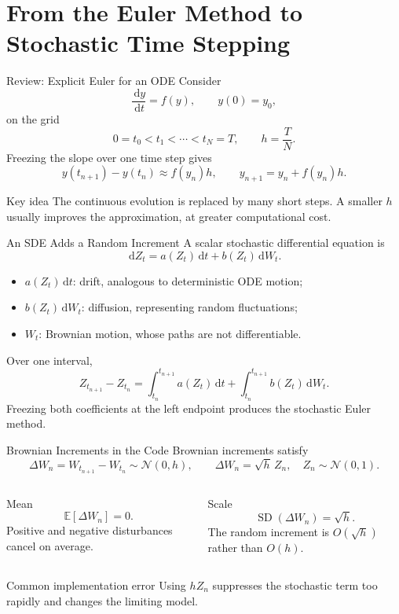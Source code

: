 \documentclass[aspectratio=169,10pt]{beamer}
\newcommand{\E}{\mathbb{E}}
\newcommand{\dd}{\,\mathrm{d}}
\newcommand{\Normal}{\mathcal{N}}
\begin{document}
\section{From the Euler Method to Stochastic Time Stepping}

\begin{frame}{Review: Explicit Euler for an ODE}
  Consider
  \[
    \frac{\dd y}{\dd t}=f(y),\qquad y(0)=y_0,
  \]
  on the grid
  \[
    0=t_0<t_1<\cdots<t_N=T,\qquad h=\frac{T}{N}.
  \]
  Freezing the slope over one time step gives
  \[
    y(t_{n+1})-y(t_n)\approx f(y_n)h,
    \qquad \boxed{y_{n+1}=y_n+f(y_n)h}.
  \]
  \begin{block}{Key idea}
    The continuous evolution is replaced by many short steps. A smaller $h$
    usually improves the approximation, at greater computational cost.
  \end{block}
\end{frame}

\begin{frame}{An SDE Adds a Random Increment}
  A scalar stochastic differential equation is
  \[
    \boxed{\dd Z_t=a(Z_t)\dd t+b(Z_t)\dd W_t}.
  \]
  \begin{itemize}
    \item $a(Z_t)\dd t$: drift, analogous to deterministic ODE motion;
    \item $b(Z_t)\dd W_t$: diffusion, representing random fluctuations;
    \item $W_t$: Brownian motion, whose paths are not differentiable.
  \end{itemize}
  Over one interval,
  \[
    Z_{t_{n+1}}-Z_{t_n}
    =\int_{t_n}^{t_{n+1}}a(Z_t)\dd t
     +\int_{t_n}^{t_{n+1}}b(Z_t)\dd W_t.
  \]
  Freezing both coefficients at the left endpoint produces the stochastic Euler method.
\end{frame}

\begin{frame}{Brownian Increments in the Code}
  Brownian increments satisfy
  \[
    \Delta W_n=W_{t_{n+1}}-W_{t_n}\sim\Normal(0,h),
    \qquad \Delta W_n=\sqrt{h}\,Z_n,\quad Z_n\sim\Normal(0,1).
  \]
  \begin{columns}[T]
    \begin{block}{Mean}
      \[
        \E[\Delta W_n]=0.
      \]
      Positive and negative disturbances cancel on average.
    \end{block}
    \begin{block}{Scale}
      \[
        \operatorname{SD}(\Delta W_n)=\sqrt h.
      \]
      The random increment is $O(\sqrt h)$ rather than $O(h)$.
    \end{block}
  \end{columns}
  \begin{alertblock}{Common implementation error}
    Using $hZ_n$ suppresses the stochastic term too rapidly and changes the limiting model.
  \end{alertblock}
\end{frame}
\end{document}

